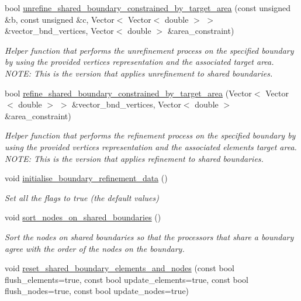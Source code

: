 \begin{DoxyCompactItemize}
bool \hyperlink{classoomph_1_1RefineableTriangleMesh_a4631299a76f524bb6bed190836e26bcd}{unrefine\+\_\+shared\+\_\+boundary\+\_\+constrained\+\_\+by\+\_\+target\+\_\+area} (const unsigned \&b, const unsigned \&c, Vector$<$ Vector$<$ double $>$ $>$ \&vector\+\_\+bnd\+\_\+vertices, Vector$<$ double $>$ \&area\+\_\+constraint)
\begin{DoxyCompactList}\small\item\em Helper function that performs the unrefinement process on the specified boundary by using the provided vertices representation and the associated target area. N\+O\+TE\+: This is the version that applies unrefinement to shared boundaries. \end{DoxyCompactList}\item 
bool \hyperlink{classoomph_1_1RefineableTriangleMesh_adf7951948c93e9b0f259a7a05c15f1c5}{refine\+\_\+shared\+\_\+boundary\+\_\+constrained\+\_\+by\+\_\+target\+\_\+area} (Vector$<$ Vector$<$ double $>$ $>$ \&vector\+\_\+bnd\+\_\+vertices, Vector$<$ double $>$ \&area\+\_\+constraint)
\begin{DoxyCompactList}\small\item\em Helper function that performs the refinement process on the specified boundary by using the provided vertices representation and the associated elements target area. N\+O\+TE\+: This is the version that applies refinement to shared boundaries. \end{DoxyCompactList}\item 
void \hyperlink{classoomph_1_1RefineableTriangleMesh_a29588a5cec8225492e3c5816105c6c49}{initialise\+\_\+boundary\+\_\+refinement\+\_\+data} ()
\begin{DoxyCompactList}\small\item\em Set all the flags to true (the default values) \end{DoxyCompactList}\item 
void \hyperlink{classoomph_1_1RefineableTriangleMesh_a6ba5b8344a33bc5ad28e4bc5e8e59cb0}{sort\+\_\+nodes\+\_\+on\+\_\+shared\+\_\+boundaries} ()
\begin{DoxyCompactList}\small\item\em Sort the nodes on shared boundaries so that the processors that share a boundary agree with the order of the nodes on the boundary. \end{DoxyCompactList}\item 
void \hyperlink{classoomph_1_1RefineableTriangleMesh_a43f080841444e0d085669db4ae580f2f}{reset\+\_\+shared\+\_\+boundary\+\_\+elements\+\_\+and\+\_\+nodes} (const bool flush\+\_\+elements=true, const bool update\+\_\+elements=true, const bool flush\+\_\+nodes=true, const bool update\+\_\+nodes=true)

\end{DoxyCompactItemize}
